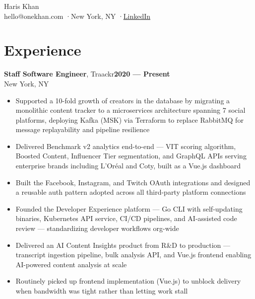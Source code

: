 \documentclass[11pt,letterpaper]{article}
\begin{document}
\begin{center}
  {\seriffont\fontsize{36}{42}\selectfont Haris {\color{accent}\serifitalicfont Khan}}\\[8pt]
  {\small\color{muted} hello@onekhan.com \quad·\quad New York, NY \quad·\quad \href{https://www.linkedin.com/in/tyrantkhan/}{LinkedIn}}
\end{center}

\vspace{8pt}

\section{Experience}

{\seriffont\fontsize{13}{16}\selectfont\bfseries Staff Software Engineer}{\color{muted}, Traackr}\hfill{\small\color{accent}\bfseries 2020 --- Present}\\
{\small\color{muted}New York, NY}
\begin{itemize}
  \item Supported a 10-fold growth of creators in the database by migrating a monolithic content tracker to a microservices architecture spanning 7 social platforms, deploying Kafka (MSK) via Terraform to replace RabbitMQ for message replayability and pipeline resilience
  \item Delivered Benchmark v2 analytics end-to-end --- VIT scoring algorithm, Boosted Content, Influencer Tier segmentation, and GraphQL APIs serving enterprise brands including L'Or\'{e}al and Coty, built as a Vue.js dashboard
  \item Built the Facebook, Instagram, and Twitch OAuth integrations and designed a reusable auth pattern adopted across all third-party platform connections
  \item Founded the Developer Experience platform --- Go CLI with self-updating binaries, Kubernetes API service, CI/CD pipelines, and AI-assisted code review --- standardizing developer workflows org-wide
  \item Delivered an AI Content Insights product from R\&D to production --- transcript ingestion pipeline, bulk analysis API, and Vue.js frontend enabling AI-powered content analysis at scale
  \item Routinely picked up frontend implementation (Vue.js) to unblock delivery when bandwidth was tight rather than letting work stall
\end{itemize}
\end{document}
